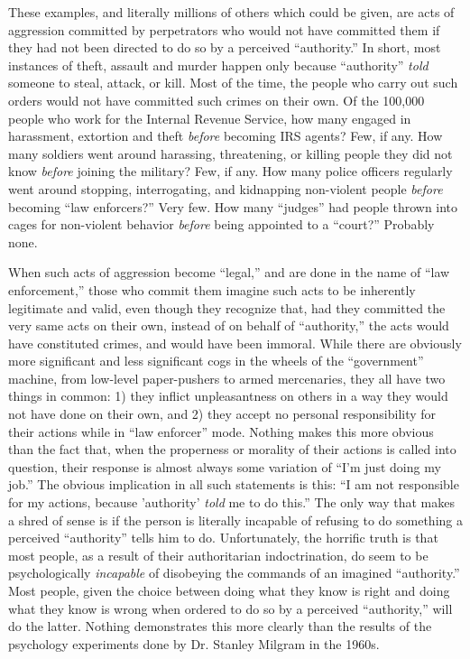 \documentclass{book}
\begin{document}
These examples, and literally millions of others which could be given, are acts of aggression committed by perpetrators who would not have committed them if they had not been directed to do so by a perceived \enquote{authority.} In short, most instances of theft, assault and murder happen only because \enquote{authority} \emph{told} someone to steal, attack, or kill. Most of the time, the people who carry out such orders would not have committed such crimes on their own. Of the 100,000 people who work for the Internal Revenue Service, how many engaged in harassment, extortion and theft \emph{before} becoming IRS agents? Few, if any. How many soldiers went around harassing, threatening, or killing people they did not know \emph{before} joining the military? Few, if any. How many police officers regularly went around stopping, interrogating, and kidnapping non-violent people \emph{before} becoming \enquote{law enforcers?} Very few. How many \enquote{judges} had people thrown into cages for non-violent behavior \emph{before} being appointed to a \enquote{court?} Probably none.

When such acts of aggression become \enquote{legal,} and are done in the name of \enquote{law enforcement,} those who commit them imagine such acts to be inherently legitimate and valid, even though they recognize that, had they committed the very same acts on their own, instead of on behalf of \enquote{authority,} the acts would have constituted crimes, and would have been immoral. While there are obviously more significant and less significant cogs in the wheels of the \enquote{government} machine, from low-level paper-pushers to armed mercenaries, they all have two things in common: 1) they inflict unpleasantness on others in a way they would not have done on their own, and 2) they accept no personal responsibility for their actions while in \enquote{law enforcer} mode. Nothing makes this more obvious than the fact that, when the properness or morality of their actions is called into question, their response is almost always some variation of \enquote{I'm just doing my job.} The obvious implication in all such statements is this: \enquote{I am not responsible for my actions, because 'authority' \emph{told} me to do this.} The only way that makes a shred of sense is if the person is literally incapable of refusing to do something a perceived \enquote{authority} tells him to do. Unfortunately, the horrific truth is that most people, as a result of their authoritarian indoctrination, do seem to be psychologically \emph{incapable} of disobeying the commands of an imagined \enquote{authority.} Most people, given the choice between doing what they know is right and doing what they know is wrong when ordered to do so by a perceived \enquote{authority,} will do the latter. Nothing demonstrates this more clearly than the results of the psychology experiments done by Dr. Stanley Milgram in the 1960s.
\end{document}
